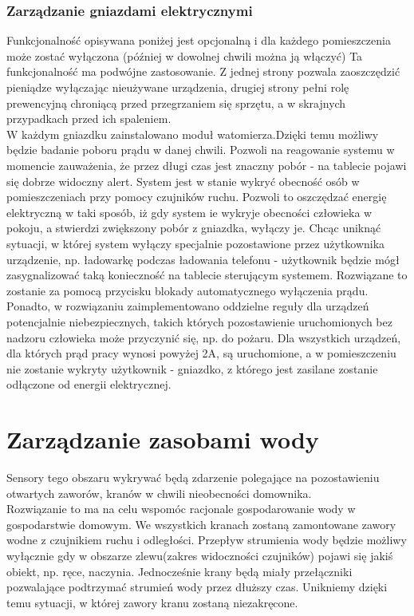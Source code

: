 \documentclass[12pt]{article} %
\begin{document}
\subsubsection{Zarządzanie gniazdami elektrycznymi}
Funkcjonalność opisywana poniżej jest opcjonalną i dla każdego pomieszczenia może zostać wyłączona (później w dowolnej chwili można ją włączyć) Ta funkcjonalność ma podwójne zastosowanie. Z jednej strony pozwala zaoszczędzić pieniądze wyłączając nieużywane urządzenia,  drugiej strony pełni rolę prewencyjną chroniącą przed przegrzaniem się sprzętu, a w skrajnych przypadkach przed ich spaleniem.
\\
W każdym gniazdku zainstalowano moduł watomierza.Dzięki temu możliwy będzie badanie poboru prądu w danej chwili. Pozwoli na reagowanie systemu w momencie zauważenia, że przez długi czas jest znaczny pobór - na tablecie pojawi się dobrze widoczny alert. System jest w stanie wykryć obecność osób w pomieszczeniach przy pomocy czujników ruchu. Pozwoli to oszczędzać energię elektryczną w taki sposób, iż gdy system ie wykryje obecności człowieka w pokoju, a stwierdzi zwiększony pobór z gniazdka, wyłączy je. Chcąc uniknąć sytuacji, w której system wyłączy specjalnie pozostawione przez użytkownika urządzenie, np. ładowarkę podczas ładowania telefonu - użytkownik będzie mógł zasygnalizować taką konieczność na tablecie sterującym systemem. Rozwiązane to zostanie za pomocą przycisku blokady automatycznego wyłączenia prądu.
\\
Ponadto, w rozwiązaniu zaimplementowano oddzielne reguły dla urządzeń potencjalnie niebezpiecznych, takich których pozostawienie uruchomionych bez nadzoru człowieka może przyczynić się, np. do pożaru. Dla wszystkich urządzeń, dla których prąd pracy wynosi powyżej 2A, są uruchomione, a w pomieszczeniu nie zostanie wykryty użytkownik - gniazdko, z którego jest zasilane zostanie odłączone od energii elektrycznej.



\section{Zarządzanie zasobami wody}
Sensory tego obszaru wykrywać będą zdarzenie polegające na pozostawieniu otwartych zaworów, kranów w chwili nieobecności domownika. 
\\
Rozwiązanie to ma na celu wspomóc racjonale gospodarowanie wody w gospodarstwie domowym. We wszystkich kranach zostaną zamontowane zawory wodne z czujnikiem ruchu i odległości. Przepływ strumienia wody będzie możliwy wyłącznie gdy w obszarze zlewu(zakres widoczności czujników) pojawi się jakiś obiekt, np. ręce, naczynia. Jednocześnie krany będą miały przełączniki pozwalające podtrzymać strumień wody przez dłuższy czas. Unikniemy dzięki temu sytuacji, w której zawory kranu zostaną niezakręcone.
\end{document}
